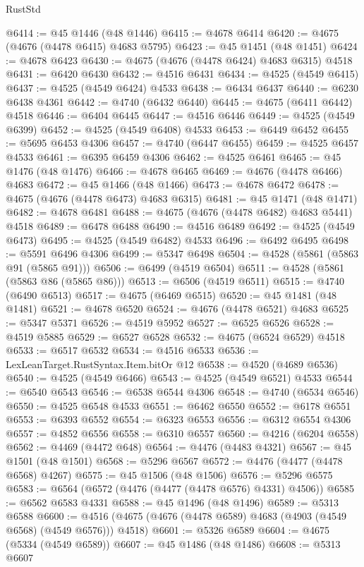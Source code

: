\begin{lexlean}{RustStd}
\begin{coremodule}
{\begin{coremodule}
{{{{{{{{{{{{{{{{{{{{{{{{{{{{{{{{{{{{{{{{{{{{{{{{{{{{{{{{{{{{@6414 := @45 @1446 (@48 @1446)
@6415 := @4678 @6414
@6420 := @4675 (@4676 (@4478 @6415) @4683 @5795)
@6423 := @45 @1451 (@48 @1451)
@6424 := @4678 @6423
@6430 := @4675 (@4676 (@4478 @6424) @4683 @6315) @4518
@6431 := @6420 @6430
@6432 := @4516 @6431
@6434 := @4525 (@4549 @6415)
@6437 := @4525 (@4549 @6424) @4533
@6438 := @6434 @6437
@6440 := @6230 @6438 @4361
@6442 := @4740 (@6432 @6440)
@6445 := @4675 (@6411 @6442) @4518
@6446 := @6404 @6445
@6447 := @4516 @6446
@6449 := @4525 (@4549 @6399)
@6452 := @4525 (@4549 @6408) @4533
@6453 := @6449 @6452
@6455 := @5695 @6453 @4306
@6457 := @4740 (@6447 @6455)
@6459 := @4525 @6457 @4533
@6461 := @6395 @6459 @4306
@6462 := @4525 @6461
@6465 := @45 @1476 (@48 @1476)
@6466 := @4678 @6465
@6469 := @4676 (@4478 @6466) @4683
@6472 := @45 @1466 (@48 @1466)
@6473 := @4678 @6472
@6478 := @4675 (@4676 (@4478 @6473) @4683 @6315)
@6481 := @45 @1471 (@48 @1471)
@6482 := @4678 @6481
@6488 := @4675 (@4676 (@4478 @6482) @4683 @5441) @4518
@6489 := @6478 @6488
@6490 := @4516 @6489
@6492 := @4525 (@4549 @6473)
@6495 := @4525 (@4549 @6482) @4533
@6496 := @6492 @6495
@6498 := @5591 @6496 @4306
@6499 := @5347 @6498
@6504 := @4528 (@5861 (@5863 @91 (@5865 @91)))
@6506 := @6499 (@4519 @6504)
@6511 := @4528 (@5861 (@5863 @86 (@5865 @86)))
@6513 := @6506 (@4519 @6511)
@6515 := @4740 (@6490 @6513)
@6517 := @4675 (@6469 @6515)
@6520 := @45 @1481 (@48 @1481)
@6521 := @4678 @6520
@6524 := @4676 (@4478 @6521) @4683
@6525 := @5347 @5371
@6526 := @4519 @5952
@6527 := @6525 @6526
@6528 := @4519 @5885
@6529 := @6527 @6528
@6532 := @4675 (@6524 @6529) @4518
@6533 := @6517 @6532
@6534 := @4516 @6533
@6536 := LexLeanTarget.RustSyntax.Item.bitOr @12
@6538 := @4520 (@4689 @6536)
@6540 := @4525 (@4549 @6466)
@6543 := @4525 (@4549 @6521) @4533
@6544 := @6540 @6543
@6546 := @6538 @6544 @4306
@6548 := @4740 (@6534 @6546)
@6550 := @4525 @6548 @4533
@6551 := @6462 @6550
@6552 := @6178 @6551
@6553 := @6393 @6552
@6554 := @6323 @6553
@6556 := @6312 @6554 @4306
@6557 := @4852 @6556
@6558 := @6310 @6557
@6560 := @4216 (@6204 @6558)
@6562 := @4469 (@4472 @648)
@6564 := @4476 (@4483 @4321)
@6567 := @45 @1501 (@48 @1501)
@6568 := @5296 @6567
@6572 := @4476 (@4477 (@4478 @6568) @4267)
@6575 := @45 @1506 (@48 @1506)
@6576 := @5296 @6575
@6583 := @6564 (@6572 (@4476 (@4477 (@4478 @6576) @4331) @4506))
@6585 := @6562 @6583 @4331
@6588 := @45 @1496 (@48 @1496)
@6589 := @5313 @6588
@6600 := @4516 (@4675 (@4676 (@4478 @6589) @4683 (@4903 (@4549 @6568) (@4549 @6576))) @4518)
@6601 := @5326 @6589
@6604 := @4675 (@5334 (@4549 @6589))
@6607 := @45 @1486 (@48 @1486)
@6608 := @5313 @6607
}}}}}}}}}}}}}}}}}}}}}}}}}}}}}}}}}}}}}}}}}}}}}}}}}}}}}}}}}}}}
\end{coremodule}}
\end{coremodule}
\end{lexlean}
